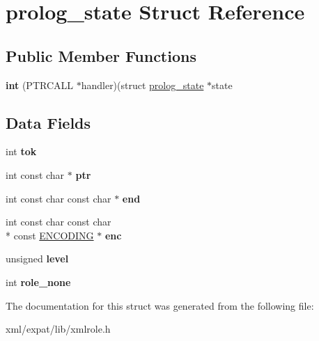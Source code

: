 \hypertarget{structprolog__state}{\section{prolog\-\_\-state Struct Reference}
\label{structprolog__state}
}
\subsection*{Public Member Functions}
\begin{DoxyCompactItemize}
\item 
\hypertarget{structprolog__state_aa5eb5916251da455f404f6acff21225a}{{\bfseries int} (P\-T\-R\-C\-A\-L\-L $\ast$handler)(struct \hyperlink{structprolog__state}{prolog\-\_\-state} $\ast$state}\label{structprolog__state_aa5eb5916251da455f404f6acff21225a}

\end{DoxyCompactItemize}
\subsection*{Data Fields}
\begin{DoxyCompactItemize}
\item 
\hypertarget{structprolog__state_ac4af903bc6d08bf5945abf850aee2a67}{int {\bfseries tok}}\label{structprolog__state_ac4af903bc6d08bf5945abf850aee2a67}

\item 
\hypertarget{structprolog__state_acc32115fc74ba5f3fd3e721670466a15}{int const char $\ast$ {\bfseries ptr}}\label{structprolog__state_acc32115fc74ba5f3fd3e721670466a15}

\item 
\hypertarget{structprolog__state_a038b72ee34bd681594ee9ecc3e2263b8}{int const char const char $\ast$ {\bfseries end}}\label{structprolog__state_a038b72ee34bd681594ee9ecc3e2263b8}

\item 
\hypertarget{structprolog__state_a7e8562ff36e1a1051fa703ca6f80228e}{int const char const char \\*
const \hyperlink{structencoding}{E\-N\-C\-O\-D\-I\-N\-G} $\ast$ {\bfseries enc}}\label{structprolog__state_a7e8562ff36e1a1051fa703ca6f80228e}

\item 
\hypertarget{structprolog__state_a9bc6e108c8efd3bc37d42feb18eb8c6b}{unsigned {\bfseries level}}\label{structprolog__state_a9bc6e108c8efd3bc37d42feb18eb8c6b}

\item 
\hypertarget{structprolog__state_aeba13f636dda0ee3f274a81fd865e223}{int {\bfseries role\-\_\-none}}\label{structprolog__state_aeba13f636dda0ee3f274a81fd865e223}

\end{DoxyCompactItemize}


The documentation for this struct was generated from the following file\-:\begin{DoxyCompactItemize}
\item 
xml/expat/lib/xmlrole.\-h\end{DoxyCompactItemize}
